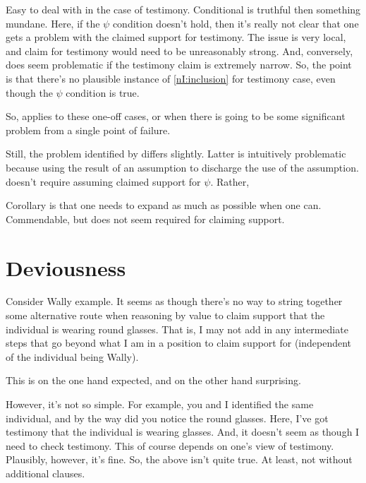 \begin{note}
  Easy to deal with in the case of testimony.
  Conditional is truthful then something mundane.
  Here, if the \(\psi\) condition doesn't hold, then it's really not clear that one gets a problem with the claimed support for testimony.
  The issue is very local, and claim for testimony would need to be unreasonably strong.
  And, conversely, does seem problematic if the testimony claim is extremely narrow.
  So, the point is that there's no plausible instance of \ref{nI:inclusion} for testimony case, even though the \(\psi\) condition is true.

  So, \nI{} applies to these one-off cases, or when there is going to be some significant problem from a single point of failure.

  Still, the problem identified by \nI{} differs slightly.
  Latter is intuitively problematic because using the result of an assumption to discharge the use of the assumption.
  \nI{} doesn't require assuming claimed support for \(\psi\).
  Rather, 

  Corollary is that one needs to expand as much as possible when one can.
  Commendable, but does not seem required for claiming support.
\end{note}


\section{Deviousness}
\label{sec:deviousness}

\begin{note}
  Consider Wally example.
  It seems as though there's no way to string together some alternative route when reasoning by value to claim support that the individual is wearing round glasses.
  That is, I may not add in any intermediate steps that go beyond what I am in a position to claim support for (independent of the individual being Wally).

  This is on the one hand expected, and on the other hand surprising.

  However, it's not so simple.
  For example, you and I identified the same individual, and by the way did you notice the round glasses.
  Here, I've got testimony that the individual is wearing glasses.
  And, it doesn't seem as though I need to check testimony.
  This of course depends on one's view of testimony.
  Plausibly, however, it's fine.
  So, the above isn't quite true.
  At least, not without additional clauses.
\end{note}

